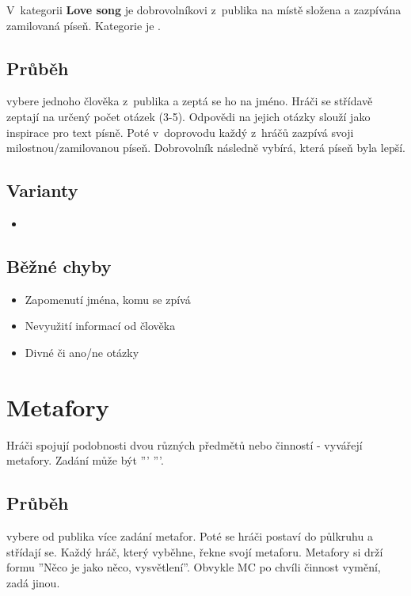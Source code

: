  
V~kategorii \textbf{Love song} je dobrovolníkovi z~publika na místě složena a zazpívána zamilovaná píseň. Kategorie je . 
 
 
\subsection{Průběh}  vybere jednoho člověka z~publika a zeptá se ho na jméno. Hráči se střídavě zeptají na určený počet otázek (3-5). Odpovědi na jejich otázky slouží jako inspirace pro text písně. Poté v~doprovodu  každý z~hráčů zazpívá svoji milostnou/zamilovanou píseň. Dobrovolník následně vybírá, která píseň byla lepší. 
 
\subsection{ Varianty } \begin{itemize}
\item {}
\end{itemize}
 
\subsection{ Běžné chyby } \begin{itemize}
\item Zapomenutí jména, komu se zpívá
\item Nevyužití informací od člověka
\item Divné či ano/ne otázky
\end{itemize}
 
 
 
 
 
 
 
\needspace{5cm} \section{Metafory} \label{metafory}  
 
Hráči spojují podobnosti dvou různých předmětů nebo činností - vyvářejí metafory. Zadání může být ''' '''. 
 
\subsection{Průběh}  
 vybere od publika více zadání metafor. Poté se hráči postaví do půlkruhu a střídají se. Každý hráč, který vyběhne, řekne svojí metaforu. Metafory si drží formu ''{Něco} je jako {něco}, {vysvětlení}''. Obvykle MC po chvíli činnost vymění, zadá jinou. 
 
